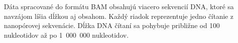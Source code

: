 Dáta spracované do formátu BAM obsahujú viacero sekvencií DNA, ktoré sa navzájom líšia dĺžkou aj obsahom.
Každý riadok reprezentuje jedno čítanie z nanopórovej sekvenácie.
Dĺžka DNA čítaní sa pohybuje približne od 100 nukleotidov až po 1~000~000 nukleotidov.
